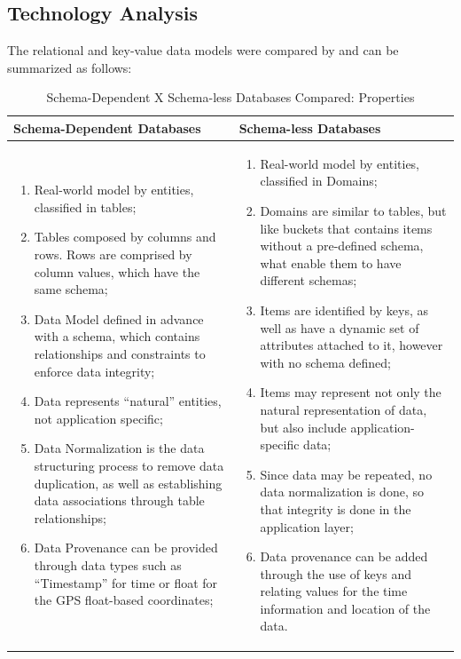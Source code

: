 \subsection{Technology Analysis}

The relational and key-value data models were compared by
\cite{db-is-rdbs-dommed} and can be summarized as follows:

\begin{table}
    \label{tab:ysi-data-distribution}
    \caption{Schema-Dependent X Schema-less Databases Compared: Properties}
    \begin{center}
    \begin{tabular}{|p{210pt}|p{210pt}|}\hline
    Schema-Dependent Databases & Schema-less Databases\\\hline
    \begin{enumerate}
      \item Real-world model by entities, classified in tables;
      \item Tables composed by columns and rows. Rows are comprised by column
      values, which have the same schema;
      \item Data Model defined in advance with a schema, which contains
      relationships and constraints to enforce data integrity;
      \item Data represents ``natural'' entities, not application specific;
      \item Data Normalization is the data structuring process to remove data
      duplication, as well as establishing data associations through table
      relationships;
      \item Data Provenance can be provided through data types such as
      ``Timestamp'' for time or float for the GPS float-based coordinates; 
    \end{enumerate} 
    & 
    \begin{enumerate}
      \item Real-world model by entities, classified in Domains;
      \item Domains are similar to tables, but like buckets that contains items
      without a pre-defined schema, what enable them to have different schemas;
      \item Items are identified by keys, as well as have a dynamic set of
      attributes attached to it, however with no schema defined;
      \item Items may represent not only the natural representation of data, but
      also include application-specific data;
      \item Since data may be repeated, no data normalization is done, so that
      integrity is done in the application layer;
      \item Data provenance can be added through the use of keys and relating
      values for the time information and location of the data.
    \end{enumerate}
    \\\hline
    \end{tabular}
    \end{center}
\end{table}

